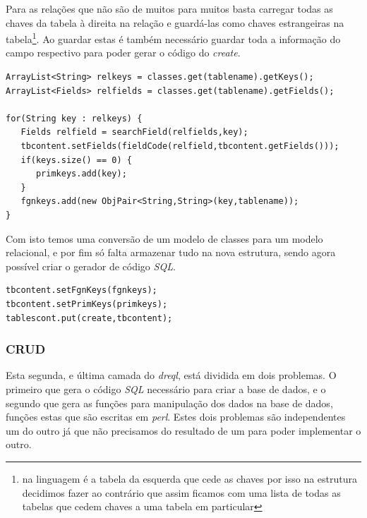 \documentclass[a4paper]{article}
\begin{document}
\hspace{1cm}Para as relações que não são de muitos para muitos basta carregar todas as chaves da tabela à direita na relação e guardá-las como chaves estrangeiras na tabela\footnote{na linguagem é a tabela da esquerda que cede as chaves por isso na estrutura decidimos fazer ao contrário que assim ficamos com uma lista de todas as tabelas que cedem chaves a uma tabela em particular}. Ao guardar estas é também necessário guardar toda a informação do campo respectivo para poder gerar o código do {\em create}.\\

\begin{small}
\begin{lstlisting}
ArrayList<String> relkeys = classes.get(tablename).getKeys();
ArrayList<Fields> relfields = classes.get(tablename).getFields();

for(String key : relkeys) {
   Fields relfield = searchField(relfields,key);
   tbcontent.setFields(fieldCode(relfield,tbcontent.getFields()));
   if(keys.size() == 0) {
      primkeys.add(key);
   }
   fgnkeys.add(new ObjPair<String,String>(key,tablename));
}
\end{lstlisting}
\end{small}

\hspace{1cm}Com isto temos uma conversão de um modelo de classes para um modelo relacional, e por fim só falta armazenar tudo na nova estrutura, sendo agora possível criar o gerador de código {\em SQL}.

\begin{small}
\begin{lstlisting}
tbcontent.setFgnKeys(fgnkeys);
tbcontent.setPrimKeys(primkeys);
tablescont.put(create,tbcontent);
\end{lstlisting}
\end{small}

\subsubsection{\large CRUD}

\hspace{1cm}Esta segunda, e última camada do {\em dreql}, está dividida em dois problemas. O primeiro que gera o código {\em SQL} necessário para criar a base de dados, e o segundo que gera as funções para manipulação dos dados na base de dados, funções estas que são escritas em {\em perl}. Estes dois problemas são independentes um do outro já que não precisamos do resultado de um para poder implementar o outro.
\end{document}
